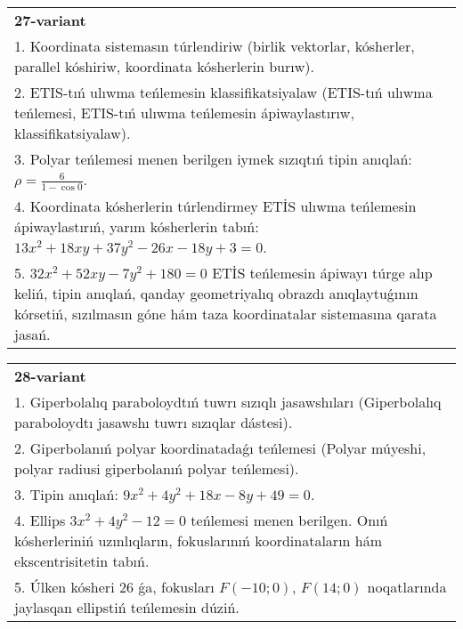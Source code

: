 \documentclass{article}
\begin{document}
\begin{tabular}{m{17cm}}
\textbf{27-variant}\\
1. Koordinata sistemasın túrlendiriw (birlik vektorlar, kósherler, parallel kóshiriw, koordinata kósherlerin burıw).\\

2. ETIS-tıń ulıwma teńlemesin klassifikatsiyalaw (ETIS-tıń ulıwma teńlemesi, ETIS-tıń ulıwma teńlemesin ápiwaylastırıw, klassifikatsiyalaw).\\

3. Polyar teńlemesi menen berilgen iymek sızıqtıń tipin anıqlań: $\rho=\frac{6}{1-\cos 0}$.\\

4. Koordinata kósherlerin túrlendirmey ETİS ulıwma teńlemesin ápiwaylastırıń, yarım kósherlerin tabıń: $13x^{2} + 18xy + 37y^{2} - 26x - 18y + 3 = 0$.  \\

5. $32x^{2} + 52xy - 7y^{2} + 180 = 0$ ETİS teńlemesin ápiwayı túrge alıp keliń, tipin anıqlań, qanday geometriyalıq obrazdı anıqlaytuǵının kórsetiń, sızılmasın góne hám taza koordinatalar sistemasına qarata jasań.  
\end{tabular}
\vspace{1cm}


\begin{tabular}{m{17cm}}
\textbf{28-variant}\\
1. Giperbolalıq paraboloydtıń tuwrı sızıqlı jasawshıları (Giperbolalıq paraboloydtı jasawshı tuwrı sızıqlar dástesi).\\

2. Giperbolanıń polyar koordinatadaǵı teńlemesi (Polyar múyeshi, polyar radiusi giperbolanıń polyar teńlemesi).\\

3. Tipin anıqlań: $9 x^{2}+4 y^{2}+18 x-8 y+49=0$.\\

4. Ellips $3x^{2} + 4y^{2} - 12 = 0$ teńlemesi menen berilgen. Onıń kósherleriniń uzınlıqların, fokuslarınıń koordinataların hám ekscentrisitetin tabıń.  \\

5. Úlken kósheri 26 ǵa, fokusları $F( - 10;0)$, $F(14;0)$ noqatlarında jaylasqan ellipstiń teńlemesin dúziń.  
\end{tabular}
\vspace{1cm}
\end{document}

